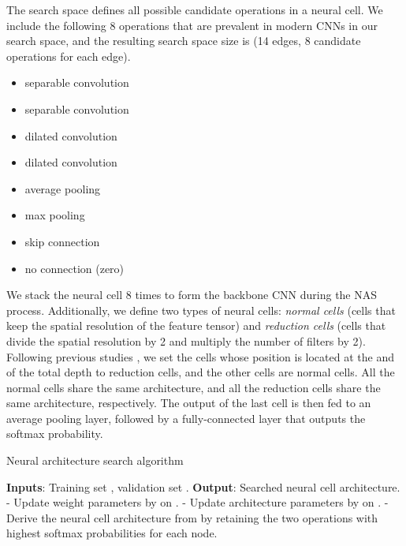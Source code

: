 \documentclass[a4paper]{article}
\begin{document}
The search space  defines all possible candidate operations in a neural cell. We include the following 8 operations that are prevalent in modern CNNs in our search space, and the resulting search space size is  (14 edges, 8 candidate operations for each edge).
\vspace{-1em}
\setlength\columnsep{0pt}
\begin{multicols}{2}
\begin{itemize}
\advance\leftskip-10pt
    \item  separable convolution
    \item  separable convolution
    \item  dilated convolution
    \item  dilated convolution
    \item  average pooling
    \item  max pooling
    \item skip connection
    \item no connection (zero)
\end{itemize}
\end{multicols}
\vspace{-1em}
We stack the neural cell 8 times to form the backbone CNN during the NAS process. Additionally, we define two types of neural cells: \textit{normal cells} (cells that keep the spatial resolution of the feature tensor) and \textit{reduction cells} (cells that divide the spatial resolution by 2 and multiply the number of filters by 2). Following previous studies \cite{zoph2018learning, liu2018darts, real2019regularized}, we set the cells whose position is located at the  and  of the total depth to reduction cells, and the other cells are normal cells. All the normal cells share the same architecture, and all the reduction cells share the same architecture, respectively. The output of the last cell is then fed to an average pooling layer, followed by a fully-connected layer that outputs the softmax probability.





\begin{algorithm}[t]
\caption{Neural architecture search algorithm}
\label{alg:nas}
\begin{algorithmic}
\STATE \textbf{Inputs}: Training set , validation set .
\STATE \textbf{Output}: Searched neural cell architecture.
\\\hrulefill
{}
    \STATE - Update weight parameters  by  on .
    \STATE - Update architecture parameters  by  on .
\ENDWHILE
\STATE - Derive the neural cell architecture from  by retaining the two operations with highest softmax probabilities for each node.
\end{algorithmic}
\end{algorithm}
\end{document}
